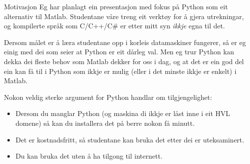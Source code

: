 \begin{frame}{Motivasjon}
  Eg har planlagt ein presentasjon med fokus på Python som eit alternativ til Matlab. Studentane våre treng eit verktøy for å gjera utrekningar, og kompilerte språk som C/C++/C\# er etter mitt syn \textit{ikkje} egna til det.

  Dersom målet er å læra studentane opp i korleis datamaskiner fungerer, så er eg einig med dei som seier at Python er eit dårleg val. Men eg trur Python kan dekka dei fleste behov som Matlab dekker for oss i dag, og at det er ein god del ein kan få til i Python som ikkje er mulig (eller i det minste ikkje er enkelt) i Matlab.

  Nokon veldig sterke argument for Python handlar om tilgjengelighet:
  \begin{itemize}
    \item Dersom du manglar Python (og maskina di ikkje er låst inne i eit HVL domene) så kan du installera det på berre nokon få minutt.
    \item Det er kostnadsfritt, så studentane kan bruka det etter dei er uteksaminert.
    \item Du kan bruka det uten å ha tilgong til internett.    
  \end{itemize}

  
\end{frame}
